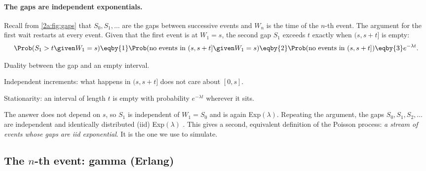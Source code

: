 \paragraph{The gaps are independent exponentials.} Recall from \cref{2a:fig:gaps} that $S_0,S_1,\dots$ are the gaps between successive events and $W_n$ is the time of the $n$-th event. The argument for the first wait restarts at every event. Given that the first event is at $W_1=s$, the second gap $S_1$ exceeds $t$ exactly when $(s,s+t]$ is empty:
\begin{align*}
  \Prob(S_1>t\given W_1=s) \eqby{1} \Prob(\text{no events in }(s,s+t]\given W_1=s) \eqby{2} \Prob(\text{no events in }(s,s+t]) \eqby{3} e^{-\lambda t}.
\end{align*}
\begin{explain}
  \item Duality between the gap and an empty interval.
  \item Independent increments: what happens in $(s,s+t]$ does not care about $[0,s]$.
  \item Stationarity: an interval of length $t$ is empty with probability $e^{-\lambda t}$ wherever it sits.
\end{explain}
The answer does not depend on $s$, so $S_1$ is independent of $W_1=S_0$ and is again Exp$(\lambda)$. Repeating the argument, the gaps $S_0,S_1,S_2,\dots$ are independent and identically distributed (iid) Exp$(\lambda)$ . This gives a second, equivalent definition of the Poisson process: \emph{a stream of events whose gaps are iid exponential}. It is the one we use to simulate.

\subsection{The $n$-th event: gamma (Erlang)}

